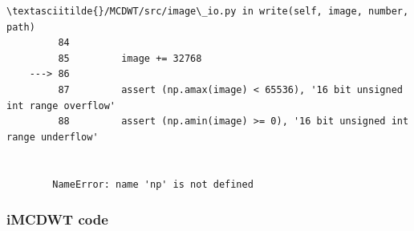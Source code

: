 {\begin{Verbatim}[commandchars=\\\{\}]
        \textasciitilde{}/MCDWT/src/image\_io.py in write(self, image, number, path)
         84 
         85         image += 32768
    ---> 86 
         87         assert (np.amax(image) < 65536), '16 bit unsigned int range overflow'
         88         assert (np.amin(image) >= 0), '16 bit unsigned int range underflow'


        NameError: name 'np' is not defined

    \end{Verbatim}

    \hypertarget{imcdwt-code}{%
\subsubsection{iMCDWT code}\label{imcdwt-code}}

\begin{Shaded}
\begin{Highlighting}[]
\OperatorTok{=}  
\OperatorTok{=}  


\end{Highlighting}
\end{Shaded}}
